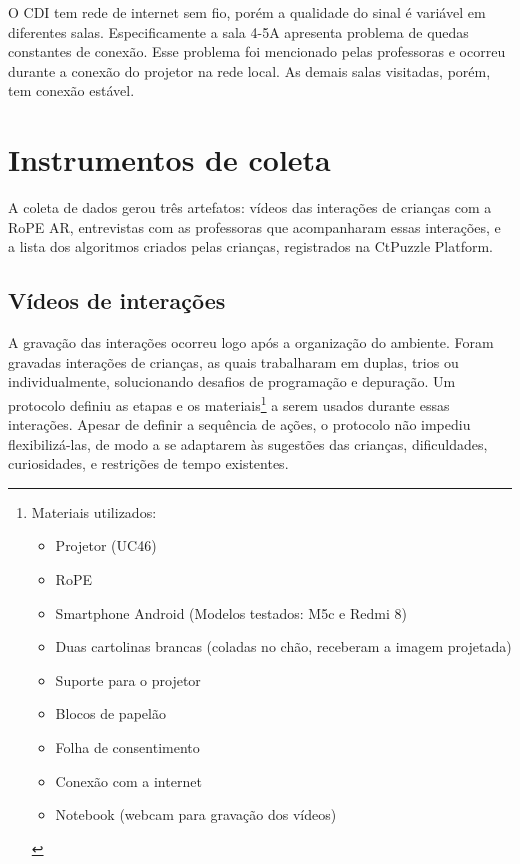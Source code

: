 O CDI tem rede de internet sem fio, porém a qualidade do sinal é variável em diferentes salas. Especificamente a sala 4-5A apresenta problema de quedas constantes de conexão. Esse problema foi mencionado pelas professoras e ocorreu durante a conexão do projetor na rede local. As demais salas visitadas, porém, tem conexão estável.

\section{Instrumentos de coleta}
\label{sec:protocolo}
A coleta de dados gerou três artefatos: vídeos das interações de crianças com a RoPE AR, entrevistas com as professoras que acompanharam essas interações, e a lista dos algoritmos criados pelas crianças, registrados na CtPuzzle Platform. 

\subsection{Vídeos de interações}
A gravação das interações ocorreu logo após a organização do ambiente. Foram gravadas interações de crianças, as quais trabalharam em duplas, trios ou individualmente, solucionando desafios de programação e depuração. Um protocolo definiu as etapas e os materiais\footnote{
    Materiais utilizados:
    \begin{itemize}
        \item Projetor (UC46)
        \item RoPE
        \item Smartphone Android (Modelos testados: M5c e Redmi 8)
        \item Duas cartolinas brancas (coladas no chão, receberam a imagem projetada)
        \item Suporte para o projetor
        \item Blocos de papelão
        \item Folha de consentimento
        \item Conexão com a internet
        \item Notebook (webcam para gravação dos vídeos)
    \end{itemize}
} a serem usados durante essas interações. Apesar de definir a sequência de ações, o protocolo não impediu flexibilizá-las, de modo a se adaptarem às sugestões das crianças, dificuldades, curiosidades, e restrições de tempo existentes.

